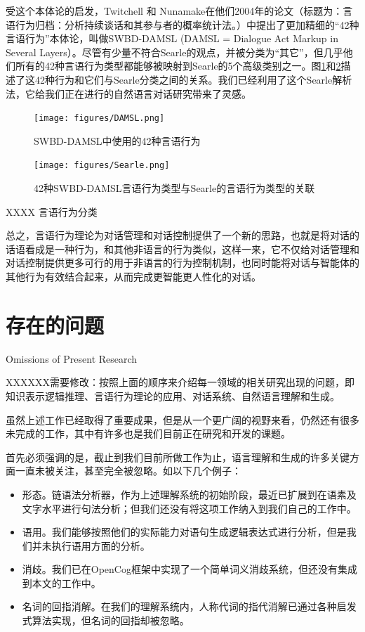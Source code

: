 受这个本体论的启发，Twitchell 和 Nunamake在他们2004年的论文（标题为：言语行为归档：分析持续谈话和其参与者的概率统计法。\cite{Twitchell2004}）中提出了更加精细的“42种言语行为”本体论，叫做SWBD-DAMSL (DAMSL = Dialogue Act Markup in Several Layers）。尽管有少量不符合Searle的观点，并被分类为“其它”，但几乎他们所有的42种言语行为类型都能够被映射到Searle的5个高级类别之一。图\ref{fig:DAMSL}和\ref{fig:Searle}描述了这42种行为和它们与Searle分类之间的关系。我们已经利用了这个Searle解析法，它给我们正在进行的自然语言对话研究带来了灵感。

\begin{figure}[htb]
\centering
\texttt{[image: figures/DAMSL.png]}
\caption{SWBD-DAMSL中使用的42种言语行为}
\label{fig:DAMSL}
\end{figure}

\begin{figure}[htb]
\centering
\texttt{[image: figures/Searle.png]}
\caption{ 42种SWBD-DAMSL言语行为类型与Searle的言语行为类型的关联}
\label{fig:Searle}
\end{figure}

XXXX 言语行为分类

总之，言语行为理论为对话管理和对话控制提供了一个新的思路，也就是将对话的话语看成是一种行为，和其他非语言的行为类似，这样一来，它不仅给对话管理和对话控制提供更多可行的用于非语言的行为控制机制，也同时能将对话与智能体的其他行为有效结合起来，从而完成更智能更人性化的对话。

\section{存在的问题}{Omissions of Present Research}

XXXXXX需要修改：按照上面的顺序来介绍每一领域的相关研究出现的问题，即知识表示逻辑推理、言语行为理论的应用、对话系统、自然语言理解和生成。

虽然上述工作已经取得了重要成果，但是从一个更广阔的视野来看，仍然还有很多未完成的工作，其中有许多也是我们目前正在研究和开发的课题。

首先必须强调的是，截止到我们目前所做工作为止，语言理解和生成的许多关键方面一直未被关注，甚至完全被忽略。如以下几个例子：
\begin{itemize}
\item 形态。链语法分析器，作为上述理解系统的初始阶段，最近已扩展到在语素及文字水平进行句法分析；但我们还没有将这项工作纳入到我们自己的工作中。
\item 语用。我们能够按照他们的实际能力对语句生成逻辑表达式进行分析，但是我们并未执行语用方面的分析。
\item 消歧。我们已在OpenCog框架中实现了一个简单词义消歧系统，但还没有集成到本文的工作中。
\item 名词的回指消解。在我们的理解系统内，人称代词的指代消解已通过各种启发式算法实现，但名词的回指却被忽略。
\end{itemize}

